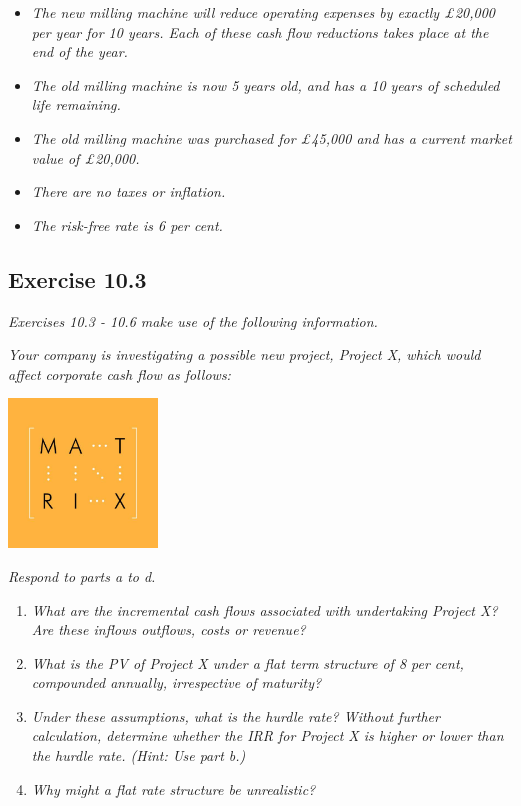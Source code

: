 \documentclass[]{book}
\theoremstyle{definition}
\theoremstyle{definition}
\theoremstyle{remark}
\begin{document}
\begin{itemize}
\item
  \emph{The new milling machine will reduce operating expenses by
  exactly £20,000 per year for 10 years. Each of these cash flow
  reductions takes place at the end of the year.} \citep[p.338]{book}
\item
  \emph{The old milling machine is now 5 years old, and has a 10 years
  of scheduled life remaining.} \citep[p.338]{book}
\item
  \emph{The old milling machine was purchased for £45,000 and has a
  current market value of £20,000.} \citep[p.338]{book}
\item
  \emph{There are no taxes or inflation.} \citep[p.338]{book}
\item
  \emph{The risk-free rate is 6 per cent.} \citep[p.338]{book}
\end{itemize}

\subsection{Exercise 10.3}\label{exercise-10.3}

\emph{Exercises 10.3 - 10.6 make use of the following information.}
\citep[p.338]{book}

\emph{Your company is investigating a possible new project, Project X,
which would affect corporate cash flow as follows:} \citep[p.338]{book}

\begin{center}\includegraphics[width=150px]{figures/matrix} \end{center}

\emph{Respond to parts a to d.} \citep[p.339]{book}

\begin{enumerate}
\def\labelenumi{\alph{enumi}.}
\item
  \emph{What are the incremental cash flows associated with undertaking
  Project X? Are these inflows outflows, costs or revenue?}
  \citep[p.339]{book}
\item
  \emph{What is the PV of Project X under a flat term structure of 8 per
  cent, compounded annually, irrespective of maturity?}
  \citep[p.339]{book}
\item
  \emph{Under these assumptions, what is the hurdle rate? Without
  further calculation, determine whether the IRR for Project X is higher
  or lower than the hurdle rate. (Hint: Use part b.)}
  \citep[p.339]{book}
\item
  \emph{Why might a flat rate structure be unrealistic?}
  \citep[p.339]{book}
\end{enumerate}
\end{document}
